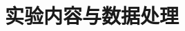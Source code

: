 \documentclass[a4paper,c5size,twoside,UTF8]{ctexart} %
\begin{document}
\section{实验内容与数据处理}




\end{document}
